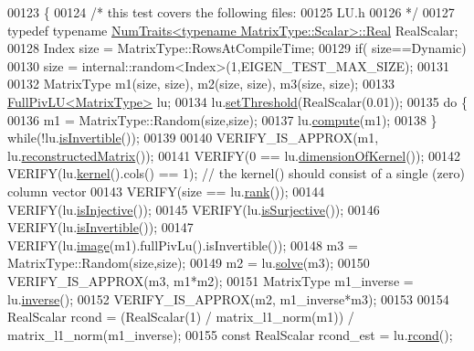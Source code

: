 \begin{DoxyCode}
00123 \{
00124   \textcolor{comment}{/* this test covers the following files:}
00125 \textcolor{comment}{     LU.h}
00126 \textcolor{comment}{  */}
00127   \textcolor{keyword}{typedef} \textcolor{keyword}{typename} \hyperlink{group___core___module_struct_eigen_1_1_num_traits}{NumTraits<typename MatrixType::Scalar>::Real}
       RealScalar;
00128   Index size = MatrixType::RowsAtCompileTime;
00129   \textcolor{keywordflow}{if}( size==Dynamic)
00130     size = internal::random<Index>(1,EIGEN\_TEST\_MAX\_SIZE);
00131 
00132   MatrixType m1(size, size), m2(size, size), m3(size, size);
00133   \hyperlink{group___l_u___module_class_eigen_1_1_full_piv_l_u}{FullPivLU<MatrixType>} lu;
00134   lu.\hyperlink{group___l_u___module_a414592d82de98f5bd075965caf56d681}{setThreshold}(RealScalar(0.01));
00135   \textcolor{keywordflow}{do} \{
00136     m1 = MatrixType::Random(size,size);
00137     lu.\hyperlink{group___l_u___module_a0a3c3b1bbafa31a03567a4573ebabc79}{compute}(m1);
00138   \} \textcolor{keywordflow}{while}(!lu.\hyperlink{group___l_u___module_afdf2579c93473650f2ef2a47a376c4a0}{isInvertible}());
00139 
00140   VERIFY\_IS\_APPROX(m1, lu.\hyperlink{group___l_u___module_a191a4f598b0c192a83ab48984e87ee51}{reconstructedMatrix}());
00141   VERIFY(0 == lu.\hyperlink{group___l_u___module_a64e191225834e91161ea53ad4b78167b}{dimensionOfKernel}());
00142   VERIFY(lu.\hyperlink{group___l_u___module_a70f52eeb2cd07dfbf790fce106fb4015}{kernel}().cols() == 1); \textcolor{comment}{// the kernel() should consist of a single (zero) column vector}
00143   VERIFY(size == lu.\hyperlink{group___l_u___module_a67a870aa69e699e058d04802ba0bdad9}{rank}());
00144   VERIFY(lu.\hyperlink{group___l_u___module_ab13992c852aa593461d9b81790b56667}{isInjective}());
00145   VERIFY(lu.\hyperlink{group___l_u___module_a1f6222875fc3a181ee1544b9b36dfda5}{isSurjective}());
00146   VERIFY(lu.\hyperlink{group___l_u___module_afdf2579c93473650f2ef2a47a376c4a0}{isInvertible}());
00147   VERIFY(lu.\hyperlink{group___l_u___module_a0893985d2dab367baa6e57c6fd0c4956}{image}(m1).fullPivLu().isInvertible());
00148   m3 = MatrixType::Random(size,size);
00149   m2 = lu.\hyperlink{group___l_u___module_af563471f6f3283fd10779ef02dd0b748}{solve}(m3);
00150   VERIFY\_IS\_APPROX(m3, m1*m2);
00151   MatrixType m1\_inverse = lu.\hyperlink{group___l_u___module_ae6f4bb55f859f6353f99cf15ecff4b25}{inverse}();
00152   VERIFY\_IS\_APPROX(m2, m1\_inverse*m3);
00153 
00154   RealScalar rcond = (RealScalar(1) / matrix\_l1\_norm(m1)) / matrix\_l1\_norm(m1\_inverse);
00155   \textcolor{keyword}{const} RealScalar rcond\_est = lu.\hyperlink{group___l_u___module_a0bc63f910960dc3e35acecc8442025b6}{rcond}();

\end{DoxyCode}
